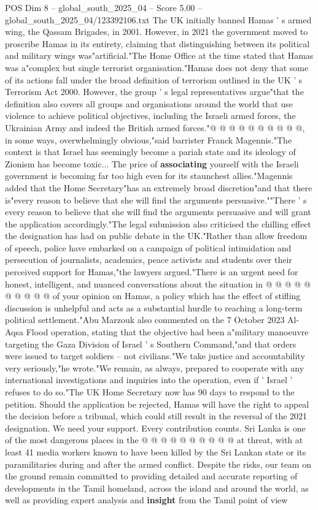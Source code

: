 \begin{textsample}{POS Dim 8 – global\_south\_2025\_04 – Score 5.00 – global\_south\_2025\_04/123392106.txt}
The UK initially banned Hamas ' s armed wing, the Qassam Brigades, in 2001.
However, in 2021 the government moved to proscribe Hamas in its entirety, claiming that distinguishing between its political and military wings was"artificial."The Home Office at the time stated that Hamas was a"complex but single terrorist organisation."Hamas does not deny that some of its actions fall under the broad definition of terrorism outlined in the UK ' s Terrorism Act 2000.
However, the group ' s legal representatives argue"that the definition also covers all groups and organisations around the world that use violence to achieve political objectives, including the Israeli armed forces, the Ukrainian Army and indeed the British armed forces."@ @ @ @ @ @ @ @ @ @, in some ways, overwhelmingly obvious,"said barrister Franck Magennis."The context is that Israel has seemingly become a pariah state and its ideology of Zionism has become toxic...
The price of \textbf{associating} yourself with the Israeli government is becoming far too high even for its staunchest allies."Magennis added that the Home Secretary"has an extremely broad discretion"and that there is"every reason to believe that she will find the arguments persuasive.""There ' s every reason to believe that she will find the arguments persuasive and will grant the application accordingly."The legal submission also criticised the chilling effect the designation has had on public debate in the UK."Rather than allow freedom of speech, police have embarked on a campaign of political intimidation and persecution of journalists, academics, peace activists and students over their perceived support for Hamas,"the lawyers argued."There is an urgent need for honest, intelligent, and nuanced conversations about the situation in @ @ @ @ @ @ @ @ @ @ of your opinion on Hamas, a policy which has the effect of stifling discussion is unhelpful and acts as a substantial hurdle to reaching a long-term political settlement."Abu Marzouk also commented on the 7 October 2023 Al-Aqsa Flood operation, stating that the objective had been a"military manoeuvre targeting the Gaza Division of Israel ' s Southern Command,"and that orders were issued to target soldiers -- not civilians."We take justice and accountability very seriously,"he wrote."We remain, as always, prepared to cooperate with any international investigations and inquiries into the operation, even if ' Israel ' refuses to do so."The UK Home Secretary now has 90 days to respond to the petition.
Should the application be rejected, Hamas will have the right to appeal the decision before a tribunal, which could still result in the reversal of the 2021 designation.
We need your support.
Every contribution counts.
Sri Lanka is one of the most dangerous places in the @ @ @ @ @ @ @ @ @ @ at threat, with at least 41 media workers known to have been killed by the Sri Lankan state or its paramilitaries during and after the armed conflict.
Despite the risks, our team on the ground remain committed to providing detailed and accurate reporting of developments in the Tamil homeland, across the island and around the world, as well as providing expert analysis and \textbf{insight} from the Tamil point of view


\end{textsample}
